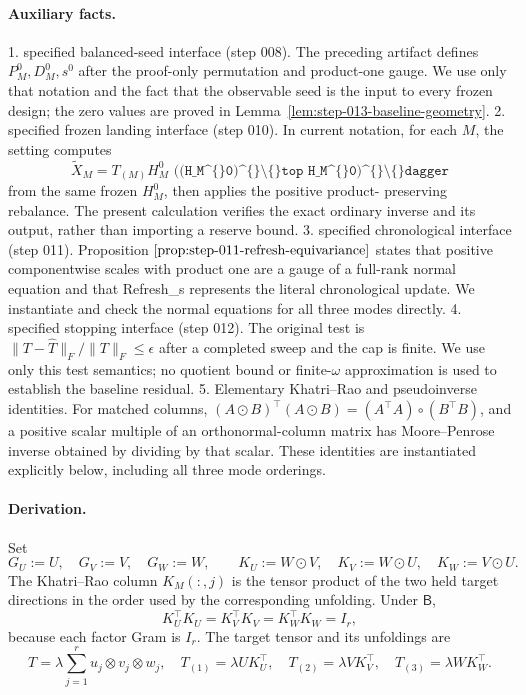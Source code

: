 \paragraph{Auxiliary facts.}

1. specified balanced-seed interface (step 008). The preceding
   artifact defines \(P_M^0,D_M^0,s^0\) after the proof-only permutation and
   product-one gauge. We use only that notation and the fact that the
   observable seed is the input to every frozen design; the zero values are
   proved in Lemma~\ref{lem:step-013-baseline-geometry}.
2. specified frozen landing interface (step 010). In current notation,
   for each \(M\), the setting computes
   \[
   \widetilde X_M=T_{(M)}H_M^0
\texttt{   ((H\_M\textasciicircum\{\}0)\textasciicircum\{\}\textbackslash\{\}top H\_M\textasciicircum\{\}0)\textasciicircum\{\}\textbackslash\{\}dagger}
   \]
   from the same frozen \(H_M^0\), then applies the positive product-
   preserving rebalance. The present calculation verifies the exact
   ordinary inverse and its output, rather than importing a reserve bound.
3. specified chronological interface (step 011). Proposition
   \(\ref{prop:step-011-refresh-equivariance}\) states that positive
   componentwise scales with product one are a gauge of a full-rank normal
   equation and that Refresh\_s represents the literal chronological update.
   We instantiate and check the normal equations for all three modes directly.
4. specified stopping interface (step 012). The original test is
   \(\|T-\widehat T\|_F/\|T\|_F\le\epsilon\) after a completed sweep and the
   cap is finite. We use only this test semantics; no quotient bound or
   finite-\(\omega\) approximation is used to establish the baseline residual.
5. Elementary Khatri--Rao and pseudoinverse identities. For matched
   columns, \((A\odot B)^\top(A\odot B)=(A^\top A)\circ(B^\top B)\), and a
   positive scalar multiple of an orthonormal-column matrix has Moore--Penrose
   inverse obtained by dividing by that scalar. These identities are
   instantiated explicitly below, including all three mode orderings.

\paragraph{Derivation.}

Set
\[
G_U:=U,\quad G_V:=V,\quad G_W:=W,\qquad
K_U:=W\odot V,\quad K_V:=W\odot U,\quad K_W:=V\odot U.
\tag{1}
\]
The Khatri--Rao column \(K_M(:,j)\) is the tensor product of the two held
target directions in the order used by the corresponding unfolding. Under
\(\mathsf B\),
\[
K_U^\top K_U=K_V^\top K_V=K_W^\top K_W=I_r,
\tag{2}
\]
because each factor Gram is \(I_r\). The target tensor and its unfoldings are
\[
T=\lambda\sum_{j=1}^r u_j\otimes v_j\otimes w_j,\quad
T_{(1)}=\lambda U K_U^\top,\quad
T_{(2)}=\lambda V K_V^\top,\quad
T_{(3)}=\lambda W K_W^\top.
\tag{3}
\]


